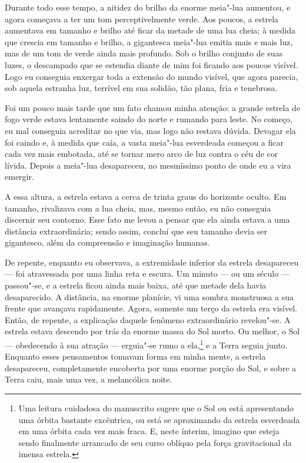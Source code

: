 Durante todo esse tempo, a nitidez do brilho da enorme meia"-lua aumentou, e agora começava a ter um tom
perceptivelmente verde. Aos poucos, a estrela aumentava em tamanho e brilho até ficar da metade de uma lua cheia; à
medida que crescia em tamanho e brilho, a gigantesca meia"-lua emitia mais e mais luz, mas de um tom de verde ainda mais
profundo. Sob o brilho conjunto de suas luzes, o descampado que se estendia diante de mim foi ficando aos poucos
visível. Logo eu conseguia enxergar toda a extensão do mundo visível, que agora parecia, sob aquela estranha luz,
terrível em sua solidão, tão plana, fria e tenebrosa.

Foi um pouco mais tarde que um fato chamou minha atenção: a grande estrela de fogo verde estava lentamente saindo do
norte e rumando para leste. No começo, eu mal conseguia acreditar no que via, mas logo não restava dúvida. Devagar
ela foi caindo e, à medida que caía, a vasta meia"-lua esverdeada começou a ficar cada vez mais embotada, até se tornar
mero arco de luz contra o céu de cor lívida. Depois a meia"-lua desapareceu, no mesmíssimo ponto de onde eu a vira
emergir.

A essa altura, a estrela estava a cerca de trinta graus do horizonte oculto. Em tamanho, rivalizava com a lua cheia,
mas, mesmo então, eu não conseguia discernir seu contorno. Esse fato me levou a pensar que ela ainda estava a uma
distância extraordinária; sendo assim, concluí que seu tamanho devia ser gigantesco, além da compreensão e imaginação
humanas.

De repente, enquanto eu observava, a extremidade inferior da estrela desapareceu --- foi atravessada por uma linha reta e
escura. Um minuto --- ou um século --- passou"-se, e a estrela ficou ainda mais baixa, até que metade dela havia
desaparecido. A distância, na enorme planície, vi uma sombra monstruosa a sua frente que avançava rapidamente. Agora,
somente um terço da estrela era visível. Então, de repente, a explicação daquele fenômeno extraordinário revelou"-se.
A estrela estava descendo por trás da enorme massa do Sol morto. Ou melhor, o Sol --- obedecendo à sua atração ---
erguia"-se rumo a ela,\footnote{ Uma leitura cuidadosa do manuscrito sugere que
o Sol ou está apresentando uma órbita bastante excêntrica, ou está se
aproximando da estrela esverdeada em uma órbita cada vez mais fraca. E, neste
ínterim, imagino que esteja sendo finalmente arrancado de seu curso oblíquo
pela força gravitacional da imensa estrela.} e a Terra seguia junto.
Enquanto esses pensamentos tomavam forma em minha mente, a estrela
desapareceu, completamente encoberta por uma enorme porção do Sol, e sobre a Terra caiu, mais uma vez, a melancólica
noite.

